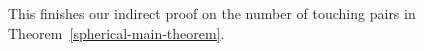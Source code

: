 \documentclass[10pt]{article}
\numberwithin{Subcase}{Case}
\begin{document}
This finishes our indirect proof on the number of touching pairs in Theorem~\ref{spherical-main-theorem}. 



















\end{document}
